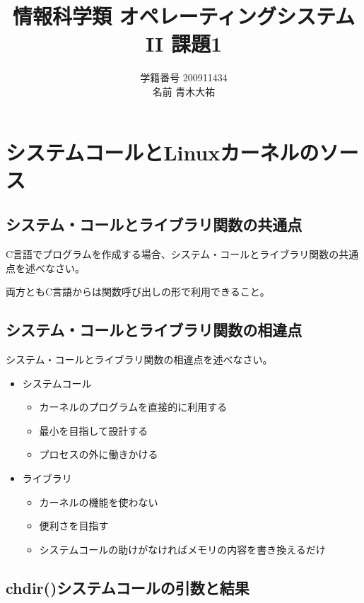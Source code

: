 \documentclass[a4j,9pt]{jsarticle}
\title{情報科学類 オペレーティングシステムII 課題1}
\author{学籍番号 200911434 \\ 名前 青木大祐}
\begin{document}
\maketitle
\section{システムコールとLinuxカーネルのソース}
\setcounter{subsection}{100}
\subsection{システム・コールとライブラリ関数の共通点}

\begin{screen}
C言語でプログラムを作成する場合、システム・コールとライブラリ関数の共通点を述べなさい。
\end{screen}

両方ともC言語からは関数呼び出しの形で利用できること。

\subsection{システム・コールとライブラリ関数の相違点}

\begin{screen}
システム・コールとライブラリ関数の相違点を述べなさい。
\end{screen}

\begin{itemize}
 \item システムコール
       \begin{itemize}
        \item カーネルのプログラムを直接的に利用する
        \item 最小を目指して設計する
        \item プロセスの外に働きかける
       \end{itemize}
 \item ライブラリ
       \begin{itemize}
        \item カーネルの機能を使わない
        \item 便利さを目指す
        \item システムコールの助けがなければメモリの内容を書き換えるだけ
       \end{itemize}
\end{itemize}

\subsection{chdir()システムコールの引数と結果}
\end{document}
